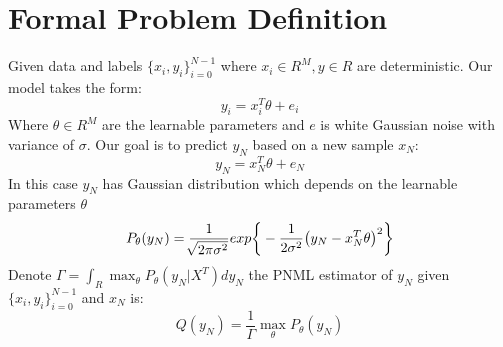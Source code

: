 \documentclass[final,1p,times]{elsarticle}
\begin{document}
\section{Formal Problem Definition}
Given data and labels $\{x_i, y_i\}_{i=0}^{N-1}$ where $x_i \in R^M, y\in R$ are deterministic. Our model takes the form:
\begin{equation}
y_i=x_i^T \theta + e_i
\end{equation}
Where $\theta \in R^M$ are the learnable parameters and $e$ is white Gaussian noise with variance of $\sigma$. Our goal is to predict $y_N$ based on a new sample $x_N$:
\begin{equation}
y_N = x_N^T \theta + e_N
\end{equation}
In this case $y_N$ has Gaussian distribution which depends on the learnable parameters $\theta$ 
\begin{equation}
P_{\theta}(y_N) 
=\frac{1}{\sqrt[]{2\pi\sigma^2}}exp\bigg\{-\frac{1}{2\sigma^2}\big(y_N- x_N^T\theta \big)^2\bigg\}  \\
\end{equation}
Denote $\Gamma=\int_R \max_{\theta} P_\theta(y_N|X^T)dy_N$ the PNML estimator of $y_N$ given $\{x_i,y_i\}_{i=0}^{N-1}$ and $x_N$ is:
\begin{equation} \label{eq:pnml_def}
Q(y_N) = \frac{1}{\Gamma} \max_{\theta} P_\theta(y_N)
\end{equation}
\end{document}
